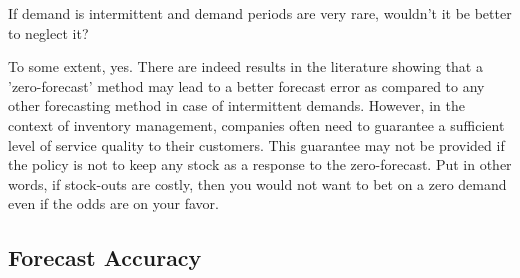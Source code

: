\begin{exercise}
If demand is intermittent and demand periods are very rare, wouldn't it be better to neglect it?




  \begin{solution}
  To some extent, yes. There are indeed results in the literature showing that a 'zero-forecast' method may lead to a better forecast error as compared to any other forecasting method in case of intermittent demands. However, in the context of inventory management, companies often need to guarantee a sufficient level of service quality to their customers. This guarantee may not be provided if the policy is not to keep any stock as a response to the zero-forecast. Put in other words, if stock-outs are costly, then you would not want to bet on a zero demand even if the odds are on your favor.
  \end{solution}
\end{exercise}



\subsection{Forecast Accuracy}


